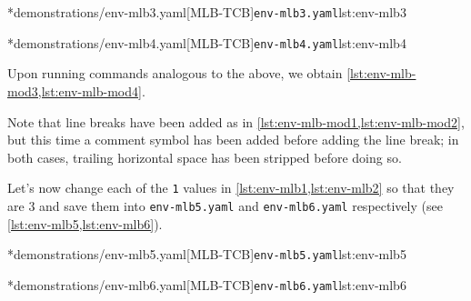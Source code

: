 		\begin{minipage}{.45\textwidth}
			\cmhlistingsfromfile[style=yaml-LST]*{demonstrations/env-mlb3.yaml}[MLB-TCB]{\texttt{env-mlb3.yaml}}{lst:env-mlb3}
		\end{minipage}
		\hfill
		\begin{minipage}{.45\textwidth}
			\cmhlistingsfromfile[style=yaml-LST]*{demonstrations/env-mlb4.yaml}[MLB-TCB]{\texttt{env-mlb4.yaml}}{lst:env-mlb4}
		\end{minipage}

		Upon running commands analogous to the above, we obtain
		\cref{lst:env-mlb-mod3,lst:env-mlb-mod4}.

		\begin{widepage}
			\begin{minipage}{.56\linewidth}
			\end{minipage}
			\hfill
			\begin{minipage}{.43\linewidth}
			\end{minipage}
		\end{widepage}

		Note that line breaks have been added as in \cref{lst:env-mlb-mod1,lst:env-mlb-mod2}, but
		this time a comment symbol has been added before adding the line break; in both cases,
		trailing horizontal space has been stripped before doing so.

		Let's%
		 now change each of the \texttt{1} values in
		\cref{lst:env-mlb1,lst:env-mlb2} so that they are $3$ and save them into
		\texttt{env-mlb5.yaml} and \texttt{env-mlb6.yaml} respectively (see
		\cref{lst:env-mlb5,lst:env-mlb6}).

		\begin{minipage}{.45\textwidth}
			\cmhlistingsfromfile[style=yaml-LST]*{demonstrations/env-mlb5.yaml}[MLB-TCB]{\texttt{env-mlb5.yaml}}{lst:env-mlb5}
		\end{minipage}
		\hfill
		\begin{minipage}{.45\textwidth}
			\cmhlistingsfromfile[style=yaml-LST]*{demonstrations/env-mlb6.yaml}[MLB-TCB]{\texttt{env-mlb6.yaml}}{lst:env-mlb6}
		\end{minipage}

